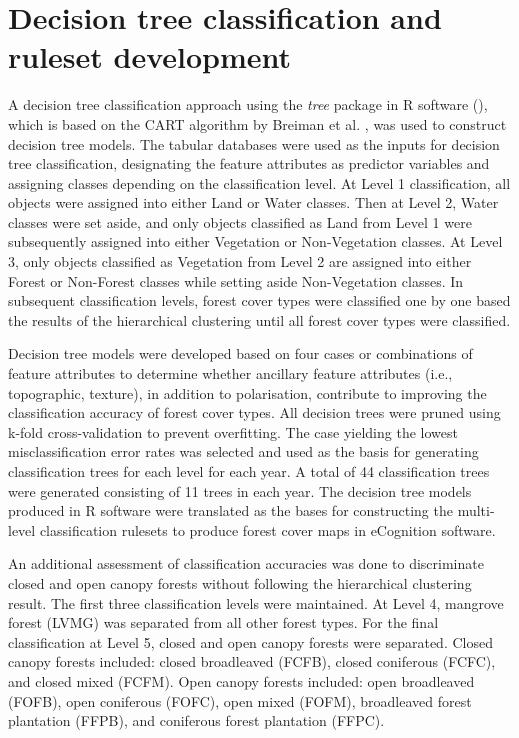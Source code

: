 \section{Decision tree classification and ruleset development}
\label{sec: method-decision-tree}

A decision tree classification approach using the \textit{tree} package in R software (\cite{ripley_tree:_2015}), which is based on the CART algorithm by Breiman et al. \citeyearpar{breiman_classification_1984}, was used to construct decision tree models. The tabular databases were used as the inputs for decision tree classification, designating the feature attributes as predictor variables and assigning classes depending on the classification level. At Level 1 classification, all objects were assigned into either Land or Water classes. Then at Level 2, Water classes were set aside, and only objects classified as Land from Level 1 were subsequently assigned into either Vegetation or Non-Vegetation classes. At Level 3, only objects classified as Vegetation from Level 2 are assigned into either Forest or Non-Forest classes while setting aside Non-Vegetation classes. In subsequent classification levels, forest cover types were classified one by one based the results of the hierarchical clustering until all forest cover types were classified.

Decision tree models were developed based on four cases or combinations of feature attributes to determine whether ancillary feature attributes (i.e., topographic, texture), in addition to polarisation, contribute to improving the classification accuracy of forest cover types. All decision trees were pruned using k-fold cross-validation to prevent overfitting. The case yielding the lowest misclassification error rates was selected and used as the basis for generating classification trees for each level for each year. A total of 44 classification trees were generated consisting of 11 trees in each year. The decision tree models produced in R software were translated as the bases for constructing the multi-level classification rulesets to produce forest cover maps in eCognition software.

An additional assessment of classification accuracies was done to discriminate closed and open canopy forests without following the hierarchical clustering result. The first three classification levels were maintained. At Level 4, mangrove forest (LVMG) was separated from all other forest types. For the final classification at Level 5, closed and open canopy forests were separated. Closed canopy forests included: closed broadleaved (FCFB), closed coniferous (FCFC), and closed mixed (FCFM). Open canopy forests included: open broadleaved (FOFB), open coniferous (FOFC), open mixed (FOFM), broadleaved forest plantation (FFPB), and coniferous forest plantation (FFPC).
